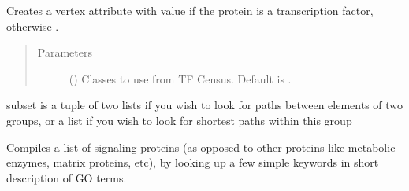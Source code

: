 \documentclass[letterpaper,10pt,english]{sphinxmanual}
\begin{document}
\begin{fulllineitems}
\begin{fulllineitems}
\end{fulllineitems}


\begin{fulllineitems}
\label{\detokenize{main:pypath.main.PyPath.set_tfs}}
\end{fulllineitems}


\begin{fulllineitems}
\label{\detokenize{main:pypath.main.PyPath.set_transcription_factors}}
Creates a vertex attribute  with value  if
the protein is a transcription factor, otherwise .
\begin{quote}\begin{description}
\item[{Parameters}] \leavevmode
{} () \textendash{} Classes to use from TF Census. Default is \sphinxtitleref{{[}‘a’, ‘b’, ‘other’{]}}.

\end{description}\end{quote}

\end{fulllineitems}


\begin{fulllineitems}
\label{\detokenize{main:pypath.main.PyPath.shortest_path_dist}}
subset is a tuple of two lists if you wish to look for
paths between elements of two groups, or a list if you
wish to look for shortest paths within this group

\end{fulllineitems}


\begin{fulllineitems}
\label{\detokenize{main:pypath.main.PyPath.signaling_proteins_list}}
Compiles a list of signaling proteins (as opposed to other
proteins like metabolic enzymes, matrix proteins, etc), by
looking up a few simple keywords in short description of GO
terms.


\end{fulllineitems}
\end{fulllineitems}
\end{document}
